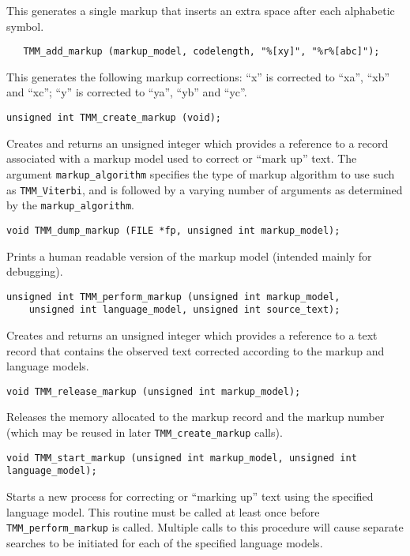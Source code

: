 \documentclass[11pt]{article}
\begin{document}
{\vspace{-0.6cm}
   This generates a single markup that inserts an extra space after each alphabetic symbol.

   \begin{verbatim}
   TMM_add_markup (markup_model, codelength, "%[xy]", "%r%[abc]");
   \end{verbatim}

\vspace{-0.6cm}
   This generates the following markup corrections: ``x'' is corrected to ``xa'', ``xb'' and ``xc'';
   ``y'' is corrected to ``ya'', ``yb'' and ``yc''.

\begin{verbatim}
unsigned int TMM_create_markup (void);
\end{verbatim}

\vspace{-0.2cm}
Creates and returns an unsigned integer which provides a reference to a record associated
with a markup model used to correct or ``mark up'' text. The argument \verb|markup_algorithm| specifies
   the type of markup algorithm to use such as \verb|TMM_Viterbi|, and is followed by a varying
   number of arguments as determined by the \verb|markup_algorithm|. 

\begin{verbatim}
void TMM_dump_markup (FILE *fp, unsigned int markup_model);
\end{verbatim}

\vspace{-0.2cm}
Prints a human readable version of the markup model (intended mainly for debugging).

\begin{verbatim}
unsigned int TMM_perform_markup (unsigned int markup_model,
    unsigned int language_model, unsigned int source_text);
\end{verbatim}

\vspace{-0.2cm}
Creates and returns an unsigned integer which provides a reference to a text record
that contains the observed text corrected according to the markup and language models.

\begin{verbatim}
void TMM_release_markup (unsigned int markup_model);
\end{verbatim}

\vspace{-0.2cm}
Releases the memory allocated to the markup record and the markup number
(which may be reused in later \verb|TMM_create_markup| calls).

\begin{verbatim}
void TMM_start_markup (unsigned int markup_model, unsigned int language_model);
\end{verbatim}

\vspace{-0.2cm}
Starts a new process for correcting or ``marking up'' text using the specified
language model. This routine must be called at least once before
\verb|TMM_perform_markup| is called. Multiple calls to this procedure will cause
separate searches to be initiated for each of the specified language models.

}
\end{document}
